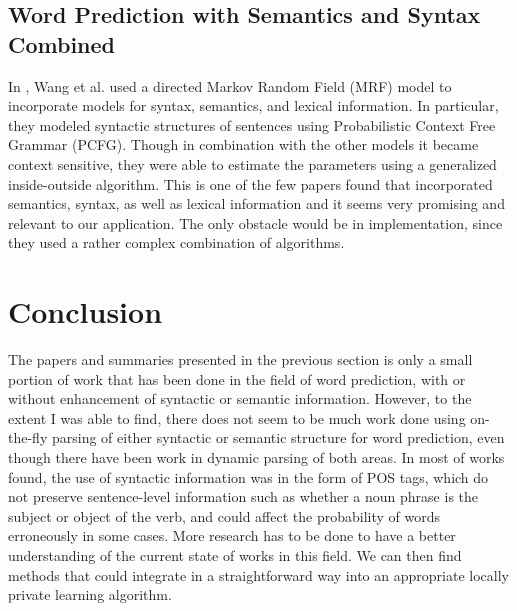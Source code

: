 \documentclass[14pt, oneside]{article}   	%
\begin{document}
\subsection{Word Prediction with Semantics and Syntax Combined}
In \cite{wang2005exploiting},
Wang et al. used a directed Markov Random Field (MRF) model
to incorporate models for syntax, semantics, and lexical information.
In particular, they modeled syntactic structures of sentences using
Probabilistic Context Free Grammar (PCFG).
Though in combination with the other models it became context sensitive,
they were able to estimate the parameters using a generalized inside-outside algorithm.
This is one of the few papers found that incorporated semantics, syntax, as well as lexical information
and it seems very promising and relevant to our application.
The only obstacle would be in implementation, since they used a rather complex combination of algorithms.
%
%
%
%
%
%
%
%
%
\section{Conclusion}
The papers and summaries presented in the previous section is only a small portion of
work that has been done in the field of word prediction,
with or without enhancement of syntactic or semantic information.
However, to the extent I was able to find,
there does not seem to be much work done using on-the-fly parsing of
either syntactic or semantic structure for word prediction,
even though there have been work in dynamic parsing of both areas.
In most of works found, the use of syntactic information was in the form of POS tags,
which do not preserve sentence-level information
such as whether a noun phrase is the subject or object of the verb,
and could affect the probability of words erroneously in some cases.
More research has to be done to have a better understanding of the current state of works in this field.
We can then find methods that could integrate in a straightforward way
into an appropriate locally private learning algorithm.
%
%
%
%
%
%    
%
%
%
%
%
%
% 
%
%
%
%
%
%
%
%
%
%
%
%
%
%
%
%



%
\end{document}
